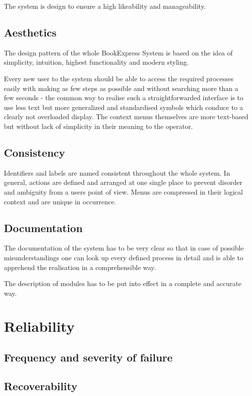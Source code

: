 \documentclass[11pt,a4paper,oneside,svgnames]{report}
\begin{document}
The system is design to ensure a high likeability and manageability.

\subsection{Aesthetics}
The design pattern of the whole BookExpress System is based on the idea of simplicity, intuition, highest functionality and modern styling.

Every new user to the system should be able to access the required processes easily with making as few steps as possible and without searching more than a few seconds - the common way to realise such a straightforwarded interface is to use less text but more generalized and standardised symbols which conduce to a clearly not overloaded display. The context menus themselves are more text-based but without lack of simplicity in their meaning to the operator.

\subsection{Consistency}
Identifiers and labels are named consistent throughout the whole system. In general, actions are defined and arranged at one single place to prevent disorder and ambiguity from a users point of view. Menus are compressed in their logical context and are unique in occurrence.

\subsection{Documentation}
The documentation of the system has to be very clear so that in case of possible misunderstandings one can look up every defined process in detail and is able to apprehend the realisation in a comprehensible way.

The description of modules has to be put into effect in a complete and accurate way.


\section{Reliability}

\subsection{Frequency and severity of failure}

\subsection{Recoverability}
\end{document}
